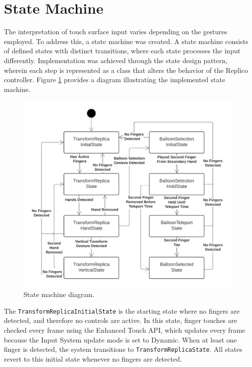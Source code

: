 \section{State Machine}

    The interpretation of touch surface input varies depending on the gestures employed. To address this, a state machine was created. A state machine consists of defined states with distinct transitions, where each state processes the input differently. Implementation was achieved through the state design pattern, wherein each step is represented as a class that alters the behavior of the Replico controller. Figure \ref{fig:states} provides a diagram illustrating the implemented state machine.

    \begin{figure}[h]
        \centering
        \includegraphics[width=1\linewidth]{figures/states.png}
        \caption{State machine diagram.}
        \label{fig:states}
    \end{figure}

    The \lstinline{TransformReplicaInitialState} is the starting state where no fingers are detected, and therefore no controls are active. In this state, finger touches are checked every frame using the Enhanced Touch API, which updates every frame because the Input System update mode is set to Dynamic. When at least one finger is detected, the system transitions to \lstinline{TransformReplicaState}. All states revert to this initial state whenever no fingers are detected.
    
